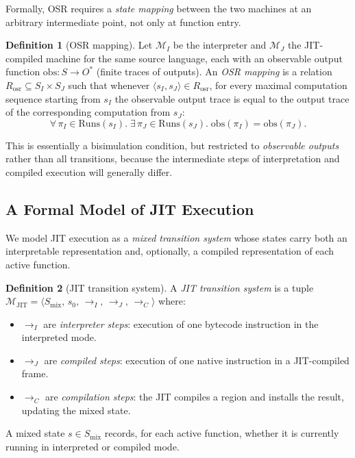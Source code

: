 \documentclass[11pt, a4paper]{article}
\theoremstyle{definition}
\newtheorem{definition}{Definition}[section]
\theoremstyle{plain}
\theoremstyle{remark}
\begin{document}
Formally, OSR requires a \emph{state mapping} between the two machines at
an arbitrary intermediate point, not only at function entry.

\begin{definition}[OSR mapping]
  Let $\mathcal{M}_I$ be the interpreter and $\mathcal{M}_J$ the JIT-compiled
  machine for the same source language, each with an observable output function
  $\mathrm{obs} : S \to O^{*}$ (finite traces of outputs). An \emph{OSR mapping}
  is a relation $R_{\mathrm{osr}} \subseteq S_I \times S_J$ such that
  whenever $\langle s_I, s_J\rangle \in R_{\mathrm{osr}}$, for every maximal
  computation sequence starting from $s_I$ the observable output trace is equal
  to the output trace of the corresponding computation from $s_J$:
  \[
    \forall\, \pi_I \in \mathrm{Runs}(s_I).\;
    \exists\, \pi_J \in \mathrm{Runs}(s_J).\;
    \mathrm{obs}(\pi_I) = \mathrm{obs}(\pi_J).
  \]
\end{definition}

This is essentially a bisimulation condition, but restricted to
\emph{observable outputs} rather than all transitions, because the
intermediate steps of interpretation and compiled execution will generally
differ.

\subsection{A Formal Model of JIT Execution}

We model JIT execution as a \emph{mixed transition system} whose states
carry both an interpretable representation and, optionally, a compiled
representation of each active function.

\begin{definition}[JIT transition system]
  A \emph{JIT transition system} is a tuple
  $\mathcal{M}_{\mathrm{JIT}} = \langle S_{\mathrm{mix}},\, s_0,\, \to_I,\,
  \to_J,\, \to_C\rangle$ where:
  \begin{itemize}
    \item $\to_I$ are \emph{interpreter steps}: execution of one bytecode
          instruction in the interpreted mode.
    \item $\to_J$ are \emph{compiled steps}: execution of one native
          instruction in a JIT-compiled frame.
    \item $\to_C$ are \emph{compilation steps}: the JIT compiles a region
          and installs the result, updating the mixed state.
  \end{itemize}
  A mixed state $s \in S_{\mathrm{mix}}$ records, for each active function,
  whether it is currently running in interpreted or compiled mode.
\end{definition}
\end{document}
